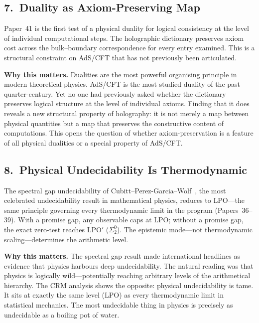 \documentclass[11pt,a4paper]{report}
\theoremstyle{plain}
\theoremstyle{definition}
\theoremstyle{remark}
\newcommand{\LPO}{\mathrm{LPO}}
\begin{document}
\subsection*{7.\ Duality as Axiom-Preserving Map}

Paper~41 is the first test of a physical duality for logical consistency at the level of individual computational steps.  The holographic dictionary preserves axiom cost across the bulk--boundary correspondence for every entry examined.  This is a structural constraint on AdS/CFT that has not previously been articulated.

\medskip\noindent
\textbf{Why this matters.}\quad
Dualities are the most powerful organising principle in modern theoretical physics.  AdS/CFT is the most studied duality of the past quarter-century.  Yet no one had previously asked whether the dictionary preserves logical structure at the level of individual axioms.  Finding that it does reveals a new structural property of holography: it is not merely a map between physical quantities but a map that preserves the constructive content of computations.  This opens the question of whether axiom-preservation is a feature of all physical dualities or a special property of AdS/CFT.

\subsection*{8.\ Physical Undecidability Is Thermodynamic}

The spectral gap undecidability of Cubitt--Perez-Garcia--Wolf~\cite{Cubitt2015}, the most celebrated undecidability result in mathematical physics, reduces to $\LPO$---the same principle governing every thermodynamic limit in the program (Papers~36--39).  With a promise gap, any observable caps at $\LPO$; without a promise gap, the exact zero-test reaches $\LPO'$ ($\Sigma^0_2$).  The epistemic mode---not thermodynamic scaling---determines the arithmetic level.

\medskip\noindent
\textbf{Why this matters.}\quad
The spectral gap result made international headlines as evidence that physics harbours deep undecidability.  The natural reading was that physics is logically wild---potentially reaching arbitrary levels of the arithmetical hierarchy.  The CRM analysis shows the opposite: physical undecidability is tame.  It sits at exactly the same level ($\LPO$) as every thermodynamic limit in statistical mechanics.  The most undecidable thing in physics is precisely as undecidable as a boiling pot of water.
\end{document}
